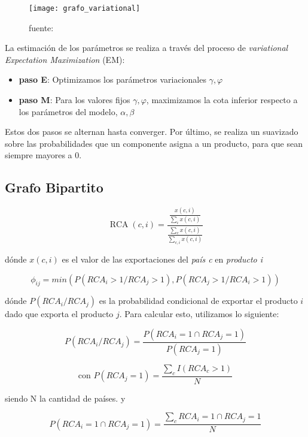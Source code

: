 \documentclass[class=article, crop=false]{standalone}
\begin{document}
\begin{figure}[h]
	\centering	
	\texttt{[image: grafo\_variational]}
	\caption{fuente: \cite{blei2003latent}}
	\label{fig:grafo_variational}
\end{figure}


La estimación de los parámetros se realiza a través del proceso de \emph{variational Expectation Maximization} (EM):

\begin{itemize}
\item \textbf{paso E}: Optimizamos los parámetros variacionales $\gamma, \varphi$
\item \textbf{paso M}: Para los valores fijos $\gamma, \varphi$, maximizamos la cota inferior respecto a los parámetros del modelo, $\alpha,\beta$
\end{itemize}

Estos dos pasos se alternan hasta converger. Por último, se realiza un suavizado sobre las probabilidades que un componente asigna a un producto, para que sean siempre mayores a 0.



\subsection{Grafo Bipartito}



$$
\operatorname{RCA}(c, i)= \frac{\displaystyle \frac{x(c, i)}{\sum_{i} x(c, i)}}{\displaystyle \frac{\sum_{c} x(c, i)}{\sum_{c, i} x(c, i)}}
$$

dónde $x(c,i)$ es el valor de las exportaciones del \textit{país c} en \textit{producto i}



$$
\phi_{ij} = min (P(RCA_i>1/RCA_j>1),P(RCA_j>1/RCA_i>1))
$$

dónde $P(RCA_i/RCA_j)$ es la probabilidad condicional de exportar el producto $i$ dado que exporta el producto $j$. Para calcular esto, utilizamos lo siguiente:



$$
P(RCA_i/RCA_j) = \frac{P(RCA_i = 1 \cap RCA_j = 1)}{P(RCA_j = 1)}
$$

$$
\text{con } P(RCA_j = 1)= \frac{ \sum_{c} I(RCA_c >1)}{N}
$$

siendo N la cantidad de países. y

$$
P(RCA_i = 1 \cap RCA_j = 1) = \frac{\sum_c RCA_i = 1 \cap RCA_j = 1}{N}
$$
\end{document}
